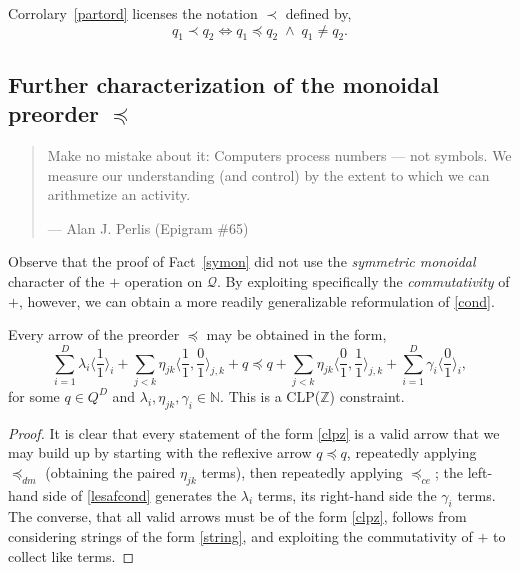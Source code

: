 \documentclass{article}
\newcommand{\N}{\mathbb{N}}
\begin{document}
\begin{nota}
  Corrolary~\ref{partord} licenses the notation $\prec$ defined by,
  $$
  q_1 \prec q_2 \iff q_1 \preceq q_2 \;\wedge\; q_1 \neq q_2.
  $$
\end{nota}

\subsection{Further characterization of the monoidal preorder $\preceq$}

\begin{quote}
  Make no mistake about it: Computers process numbers --- not symbols.
  We measure our understanding (and control) by the extent to which
  we can arithmetize an activity.
  
  \hfill --- Alan J. Perlis (Epigram \#65)
\end{quote}

Observe that the proof of Fact~\ref{symon} did not use the {\em symmetric monoidal} character of the $+$ operation on $\mathcal{Q}$.  By exploiting specifically the {\em commutativity} of $+$, however, we can obtain a more readily generalizable reformulation of \eqref{cond}.

\begin{fact}
  Every arrow of the preorder $\preceq$ may be obtained in the form,
  \begin{equation}
  \sum_{i=1}^D \lambda_i\langle\frac{1}{1}\rangle_i + \sum_{j<k} \eta_{jk}\langle\frac{1}{1},\frac{0}{1}\rangle_{j,k} +q \preceq q + \sum_{j<k} \eta_{jk}\langle\frac{0}{1},\frac{1}{1}\rangle_{j,k} + \sum_{i=1}^D \gamma_i\langle\frac{0}{1}\rangle_i, \label{clpz}
  \end{equation}
  for some $q \in Q^D$ and $\lambda_i, \eta_{jk}, \gamma_i \in \N$.  This is a CLP($\mathbb{Z}$) constraint.
\end{fact}
\begin{proof}
  It is clear that every statement of the form \eqref{clpz} is a valid arrow that we may build up by starting with the reflexive arrow $q \preceq q$, repeatedly applying $\preceq_{dm}$ (obtaining the paired $\eta_{jk}$ terms), then repeatedly applying $\preceq_{ce}$; the left-hand side of \eqref{lesafcond} generates the $\lambda_i$ terms, its right-hand side the $\gamma_i$ terms.
  The converse, that all valid arrows must be of the form \eqref{clpz}, follows from considering strings of the form \eqref{string}, and exploiting the commutativity of $+$ to collect like terms.
\end{proof}
\end{document}
